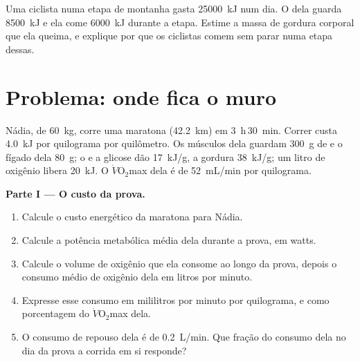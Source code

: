 \begin{exercise}[$\star\star\star$]\label{exo:g10:exercise-and-energy:15}
Uma ciclista numa etapa de montanha gasta \qty{25000}{kJ} num dia. O
 dela guarda \qty{8500}{kJ} e ela come \qty{6000}{kJ} durante
a etapa. Estime a massa de gordura corporal que ela queima, e explique
por que os ciclistas comem sem parar numa etapa dessas.
\end{exercise}

\section{Problema: onde fica o muro}

\begin{problem}
\label{pb:g10:exercise-and-energy:1}
Nádia, de \qty{60}{kg}, corre uma maratona (\qty{42.2}{km}) em
\qty{3}{h}\,\qty{30}{min}. Correr custa \qty{4.0}{kJ} por quilograma
por quilômetro. Os músculos dela guardam \qty{300}{g} de  e o
fígado dela \qty{80}{g}; o  e a glicose dão \qty{17}{kJ/g}, a
gordura \qty{38}{kJ/g}; um litro de oxigênio libera \qty{20}{kJ}. O
$\dot V\!\mathrm{O_2}$max dela é de \qty{52}{mL/min} por quilograma.

\medskip
\noindent\textbf{Parte I --- O custo da prova.}
\begin{enumerate}
  \item Calcule o custo energético da maratona para Nádia.
  \item Calcule a potência metabólica média dela durante a prova, em
        watts.
  \item Calcule o volume de oxigênio que ela consome ao longo da prova,
        depois o consumo médio de oxigênio dela em litros por minuto.
  \item Expresse esse consumo em mililitros por minuto por quilograma,
        e como porcentagem do $\dot V\!\mathrm{O_2}$max dela.
  \item O consumo de repouso dela é de \qty{0.2}{L/min}. Que fração do
        consumo dela no dia da prova a corrida em si responde?
\end{enumerate}


\end{problem}
